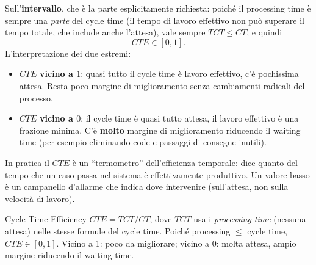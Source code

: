 Sull'\textbf{intervallo}, che è la parte esplicitamente richiesta: poiché il processing time è sempre una \emph{parte} del cycle time (il tempo di lavoro effettivo non può superare il tempo totale, che include anche l'attesa), vale sempre $TCT \le CT$, e quindi
$$CTE \in [0, 1].$$
L'interpretazione dei due estremi:
\begin{itemize}
  \item $CTE$ \textbf{vicino a $1$}: quasi tutto il cycle time è lavoro effettivo, c'è pochissima attesa. Resta poco margine di miglioramento senza cambiamenti radicali del processo.
  \item $CTE$ \textbf{vicino a $0$}: il cycle time è quasi tutto attesa, il lavoro effettivo è una frazione minima. C'è \textbf{molto} margine di miglioramento riducendo il waiting time (per esempio eliminando code e passaggi di consegne inutili).
\end{itemize}

In pratica il $CTE$ è un ``termometro'' dell'efficienza temporale: dice quanto del tempo che un caso passa nel sistema è effettivamente produttivo. Un valore basso è un campanello d'allarme che indica dove intervenire (sull'attesa, non sulla velocità di lavoro).

\begin{puntochiave}{Cycle Time Efficiency}
$CTE = TCT/CT$, dove $TCT$ usa i \emph{processing time} (nessuna attesa) nelle stesse formule del cycle time. Poiché processing $\le$ cycle time, $CTE \in [0,1]$. Vicino a 1: poco da migliorare; vicino a 0: molta attesa, ampio margine riducendo il waiting time.
\end{puntochiave}
